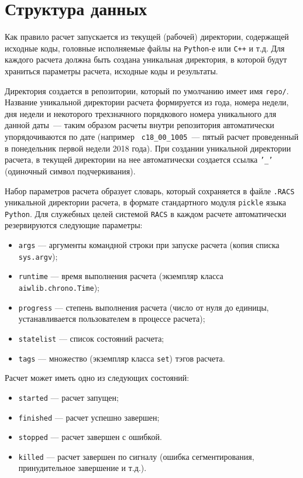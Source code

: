 \section{Структура данных}
Как правило расчет запускается из текущей (рабочей) директории,
содержащей исходные коды, головные исполняемые файлы на {\tt Python}-е или \verb'C++' и т.д. 
Для каждого расчета должна быть создана уникальная директория, в которой будут
храниться параметры расчета, исходные коды и результаты. 

Директория создается в репозитории, который по умолчанию
имеет имя {\tt repo/}. 
Название уникальной директории расчета формируется из
года, номера недели, дня недели и некоторого трехзначного порядкового номера
уникального для данной даты~--- таким образом расчеты внутри
репозитория автоматически
упорядочиваются по дате (например {\tt
  c18\_00\_1005}~--- пятый расчет проведенный в понедельник первой недели 2018
года). При создании уникальной директории расчета,  в текущей директории 
на нее автоматически создается ссылка {\tt '\_'} (одиночный символ подчеркивания).

Набор параметров расчета образует словарь, который сохраняется 
в файле \verb'.RACS' уникальной директории расчета, в формате стандартного модуля \verb'pickle'
языка \verb'Python'. 
Для служебных целей системой {\tt RACS} в каждом расчете автоматически резервируются
следующие параметры:
\begin{itemize}
\item {\tt args} --- аргументы командной строки при запуске расчета (копия
  списка {\tt sys.argv});
\item {\tt runtime} --- время выполнения расчета (экземпляр класса \verb'aiwlib.chrono.Time');
\item {\tt progress} --- степень выполнения расчета (число от нуля до
  единицы, устанавливается пользователем в процессе расчета);
\item {\tt statelist} --- список состояний расчета;
\item {\tt tags} --- множество (экземпляр класса \verb'set') тэгов расчета.
\end{itemize}

Расчет может иметь одно из следующих состояний:
\begin{itemize}
\item {\tt started} --- расчет запущен;
\item {\tt finished} --- расчет успешно завершен;
\item {\tt stopped} --- расчет завершен с ошибкой.
\item {\tt killed} --- расчет завершен по сигналу (ошибка сегментирования, принудительное завершение и т.д.).
\end{itemize}

